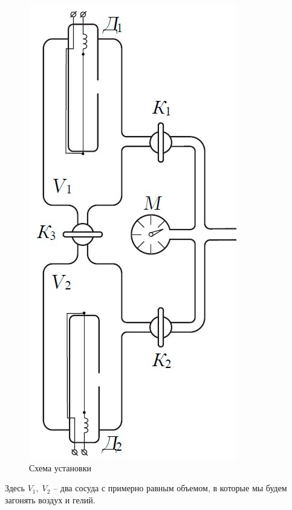 \documentclass[a4paper,12pt]{article}
\begin{document}
	\begin{figure}
		\includegraphics[width=0.9\linewidth]{facility.jpeg}				
		\caption{Схема установки}
	\end{figure}
	Здесь $V_1,\; V_2$ -- два сосуда с примерно равным объемом, в которые мы будем загонять воздух и гелий.
	
\end{document}
